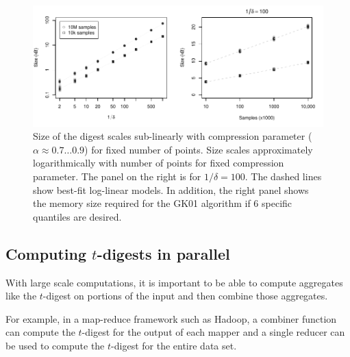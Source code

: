 \documentclass[11pt]{amsart}
\begin{document}
\begin{figure}[htb] %
   \centering
   \includegraphics[width=6in]{scaling.pdf} 
   \caption{Size of the digest scales sub-linearly with compression parameter ($\alpha \approx 0.7 \ldots 0.9$) for fixed number of points.  Size scales approximately logarithmically with number of points for fixed compression parameter.  The panel on the right is for $1/\delta = 100$.  The dashed lines show best-fit log-linear models.  In addition, the right panel shows the memory size required for the GK01 algorithm if 6 specific quantiles are desired.}
   \label{fig:accuracy-2}
\end{figure}

\subsection{Computing $t$-digests in parallel}
With large scale computations, it is important to be able to compute aggregates like the $t$-digest on portions of the input and then combine those aggregates.  

For example, in a map-reduce framework such as Hadoop, a combiner function can compute the $t$-digest for the output of each mapper and a single reducer can be used to compute the $t$-digest for the entire data set.  
\end{document}
